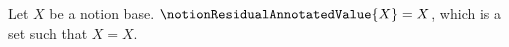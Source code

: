 

\begin{definition}\label{notion_residual_annotated_value}
    Let $X$ be a notion base.
    $\notionResidualAnnotatedValue{X}=X$, which is a set such that $X=X$.
\end{definition}
